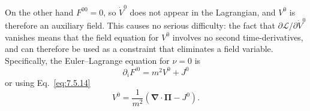 On the other hand $F^{00}=0$, so $\dot V^0$ does not appear in the
Lagrangian, and $V^0$ is therefore an auxiliary field. This causes no serious
difficulty: the fact that $\partial\mathcal L/\partial\dot V^0$ vanishes
means that the field equation for $V^0$ involves no second time-derivatives,
and can therefore be used as a constraint that eliminates a field variable.
Specifically, the Euler--Lagrange equation for $\nu=0$ is
\begin{equation}
\partial_iF^{i0}=m^2V^0+J^0
\tag{7.5.15}\label{eq:7.5.15}
\end{equation}
or using Eq.~\eqref{eq:7.5.14}
\begin{equation}
V^0=\frac1{m^2}(\boldsymbol\nabla\cdot\boldsymbol\Pi-J^0).
\tag{7.5.16}\label{eq:7.5.16}
\end{equation}

